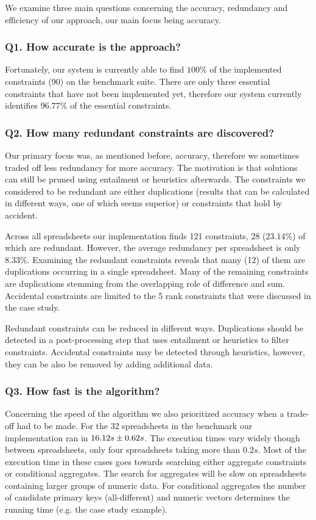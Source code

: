 \documentclass{sig-alternate-05-2015}
\begin{document}
We examine three main questions concerning the accuracy, redundancy and efficiency of our approach, our main focus being accuracy.

\subsubsection*{Q1. How accurate is the approach?}
Fortunately, our system is currently able to find $100\%$ of the implemented constraints (90) on the benchmark suite.
There are only three essential constraints that have not been implemented yet, therefore our system currently identifies $96.77\%$ of the essential constraints.

\subsubsection*{Q2. How many redundant constraints are discovered?}
Our primary focus was, as mentioned before, accuracy, therefore we sometimes traded off less redundancy for more accuracy.
The motivation is that solutions can still be pruned using entailment or heuristics afterwards.
The constraints we considered to be redundant are either duplications (results that can be calculated in different ways, one of which seems superior) or constraints that hold by accident.

Across all spreadsheets our implementation finds 121 constraints, 28 ($23.14\%$) of which are redundant.
However, the average redundancy per spreadsheet is only $8.33\%$.
Examining the redundant constraints reveals that many (12) of them are duplications occurring in a single spreadsheet.
Many of the remaining constraints are duplications stemming from the overlapping role of difference and sum.
Accidental constraints are limited to the 5 rank constraints that were discussed in the case study.

Redundant constraints can be reduced in different ways.
Duplications should be detected in a post-processing step that uses entailment or heuristics to filter constraints.
Accidental constraints may be detected through heuristics, however, they can be also be removed by adding additional data.

\subsubsection*{Q3. How fast is the algorithm?}
Concerning the speed of the algorithm we also prioritized accuracy when a trade-off had to be made.
For the 32 spreadsheets in the benchmark our implementation ran in ${16.12}s \pm {0.62}s$.
The execution times vary widely though between spreadsheets, only four spreadsheets taking more than $0.2s$.
Most of the execution time in these cases goes towards searching either aggregate constraints or conditional aggregates.
The search for aggregates will be slow on spreadsheets containing larger groups of numeric data.
For conditional aggregates the number of candidate primary keys (all-different) and numeric vectors determines the running time (e.g. the case study example).
\end{document}

